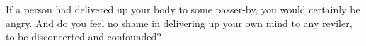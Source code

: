 If a person had  delivered up your body to some  passer-by, you would certainly
be angry.  And do  you feel  no shame  in delivering  up your  own mind  to any
reviler, to be disconcerted and confounded?
